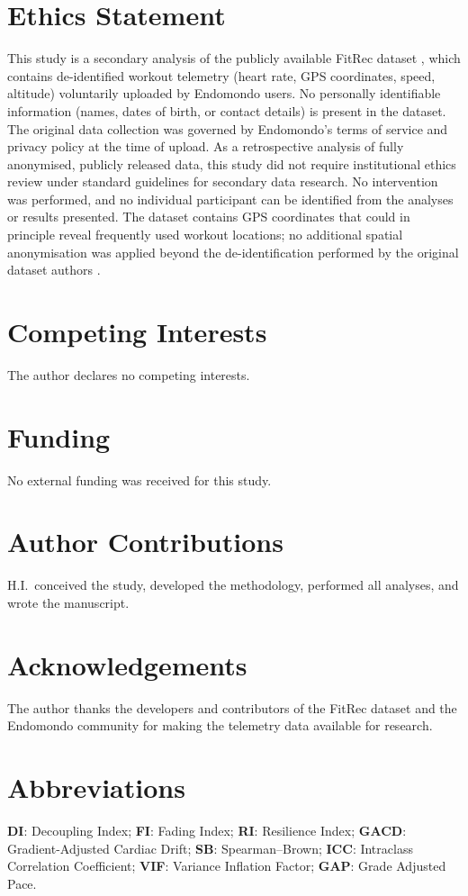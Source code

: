 \documentclass[times, twoside]{zHenriquesLab-StyleBioRxiv}
\begin{document}
\section*{Ethics Statement}
This study is a secondary analysis of the publicly available FitRec dataset \cite{ni2019}, which contains de-identified workout telemetry (heart rate, GPS coordinates, speed, altitude) voluntarily uploaded by Endomondo users. No personally identifiable information (names, dates of birth, or contact details) is present in the dataset. The original data collection was governed by Endomondo's terms of service and privacy policy at the time of upload. As a retrospective analysis of fully anonymised, publicly released data, this study did not require institutional ethics review under standard guidelines for secondary data research. No intervention was performed, and no individual participant can be identified from the analyses or results presented. The dataset contains GPS coordinates that could in principle reveal frequently used workout locations; no additional spatial anonymisation was applied beyond the de-identification performed by the original dataset authors \cite{ni2019}.

\section*{Competing Interests}
The author declares no competing interests.

\section*{Funding}
No external funding was received for this study.

\section*{Author Contributions}
H.I.\ conceived the study, developed the methodology, performed all analyses, and wrote the manuscript.

\section*{Acknowledgements}
The author thanks the developers and contributors of the FitRec dataset and the Endomondo community for making the telemetry data available for research.

\section*{Abbreviations}
\textbf{DI}: Decoupling Index; \textbf{FI}: Fading Index; \textbf{RI}: Resilience Index; \textbf{GACD}: Gradient-Adjusted Cardiac Drift; \textbf{SB}: Spearman--Brown; \textbf{ICC}: Intraclass Correlation Coefficient; \textbf{VIF}: Variance Inflation Factor; \textbf{GAP}: Grade Adjusted Pace.
\end{document}
